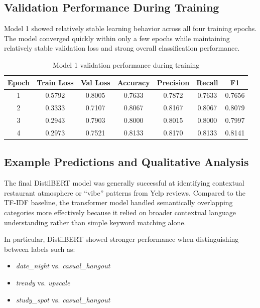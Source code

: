 \documentclass[11pt]{article}
\begin{document}
\subsection{Validation Performance During Training}

Model 1 showed relatively stable learning behavior across all four training epochs. The model converged quickly within only a few epochs while maintaining 
relatively stable validation loss and strong overall classification performance.

\begin{table}[h]
\centering
\begin{tabular}{ccccccc}
\toprule
Epoch & Train Loss & Val Loss & Accuracy & Precision & Recall & F1 \\
\midrule
1 & 0.5792 & 0.8005 & 0.7633 & 0.7872 & 0.7633 & 0.7656 \\
2 & 0.3333 & 0.7107 & 0.8067 & 0.8167 & 0.8067 & 0.8079 \\
3 & 0.2943 & 0.7903 & 0.8000 & 0.8015 & 0.8000 & 0.7997 \\
4 & 0.2973 & 0.7521 & 0.8133 & 0.8170 & 0.8133 & 0.8141 \\
\bottomrule
\end{tabular}
\caption{Model 1 validation performance during training}
\end{table}


\subsection{Example Predictions and Qualitative Analysis}

The final DistilBERT model was generally successful at identifying contextual restaurant atmosphere or ``vibe'' patterns from Yelp reviews. 
Compared to the TF-IDF baseline, the transformer model handled semantically overlapping categories more effectively because it relied on 
broader contextual language understanding rather than simple keyword matching alone.

\smallbreak \noindent In particular, DistilBERT showed stronger performance when distinguishing between labels such as:
\begin{itemize}[nosep]
    \item \textit{date\_night} vs. \textit{casual\_hangout}
    \item \textit{trendy} vs. \textit{upscale}
    \item \textit{study\_spot} vs. \textit{casual\_hangout}
\end{itemize}
\end{document}
